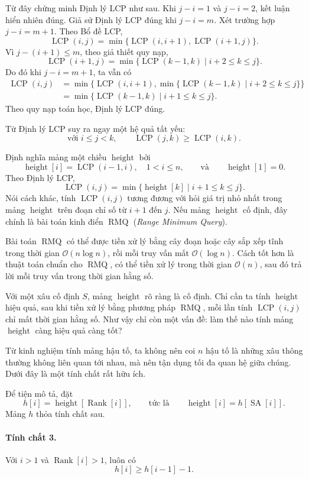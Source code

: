 \documentclass[11pt]{article}
\newcommand{\Oh}{\mathcal{O}}
\newcommand{\SA}{\operatorname{SA}}
\newcommand{\Rank}{\operatorname{Rank}}
\newcommand{\Height}{\operatorname{height}}
\newcommand{\LCP}{\operatorname{LCP}}
\newcommand{\RMQ}{\operatorname{RMQ}}
\begin{document}
Từ đây chứng minh Định lý LCP như sau. Khi \(j-i=1\) và \(j-i=2\), kết luận
hiển nhiên đúng. Giả sử Định lý LCP đúng khi \(j-i=m\). Xét trường hợp
\(j-i=m+1\). Theo Bổ đề LCP,
\[
  \LCP(i,j)=\min\{\LCP(i,i+1),\LCP(i+1,j)\}.
\]
Vì \(j-(i+1)\le m\), theo giả thiết quy nạp,
\[
  \LCP(i+1,j)=\min\{\LCP(k-1,k)\mid i+2\le k\le j\}.
\]
Do đó khi \(j-i=m+1\), ta vẫn có
\[
\begin{aligned}
  \LCP(i,j)
  &=\min\{\LCP(i,i+1),
      \min\{\LCP(k-1,k)\mid i+2\le k\le j\}\}\\
  &=\min\{\LCP(k-1,k)\mid i+1\le k\le j\}.
\end{aligned}
\]
Theo quy nạp toán học, Định lý LCP đúng.

Từ Định lý LCP suy ra ngay một hệ quả tất yếu:
\[
  \text{với }i\le j<k,\qquad \LCP(j,k)\ge \LCP(i,k).
\]

Định nghĩa mảng một chiều \(\Height\) bởi
\[
  \Height[i]=\LCP(i-1,i),\quad 1<i\le n,
  \qquad\text{và}\qquad \Height[1]=0.
\]
Theo Định lý LCP,
\[
  \LCP(i,j)=\min\{\Height[k]\mid i+1\le k\le j\}.
\]
Nói cách khác, tính \(\LCP(i,j)\) tương đương với hỏi giá trị nhỏ nhất trong
mảng \(\Height\) trên đoạn chỉ số từ \(i+1\) đến \(j\). Nếu mảng \(\Height\)
cố định, đây chính là bài toán kinh điển \(\RMQ\)
(\textit{Range Minimum Query}).

Bài toán \(\RMQ\) có thể được tiền xử lý bằng cây đoạn hoặc cây sắp xếp tĩnh
trong thời gian \(\Oh(n\log n)\), rồi mỗi truy vấn mất \(\Oh(\log n)\). Cách
tốt hơn là thuật toán chuẩn cho \(\RMQ\), có thể tiền xử lý trong thời gian
\(\Oh(n)\), sau đó trả lời mỗi truy vấn trong thời gian hằng số.

Với một xâu cố định \(S\), mảng \(\Height\) rõ ràng là cố định. Chỉ cần ta
tính \(\Height\) hiệu quả, sau khi tiền xử lý bằng phương pháp \(\RMQ\), mỗi
lần tính \(\LCP(i,j)\) chỉ mất thời gian hằng số. Như vậy chỉ còn một vấn đề:
làm thế nào tính mảng \(\Height\) càng hiệu quả càng tốt?

Từ kinh nghiệm tính mảng hậu tố, ta không nên coi \(n\) hậu tố là những xâu
thông thường không liên quan tới nhau, mà nên tận dụng tối đa quan hệ giữa
chúng. Dưới đây là một tính chất rất hữu ích.

Để tiện mô tả, đặt
\[
  h[i]=\Height[\Rank[i]],
  \qquad\text{tức là}\qquad
  \Height[i]=h[\SA[i]].
\]
Mảng \(h\) thỏa tính chất sau.

\paragraph{Tính chất 3.}
Với \(i>1\) và \(\Rank[i]>1\), luôn có
\[
  h[i]\ge h[i-1]-1.
\]
\end{document}
